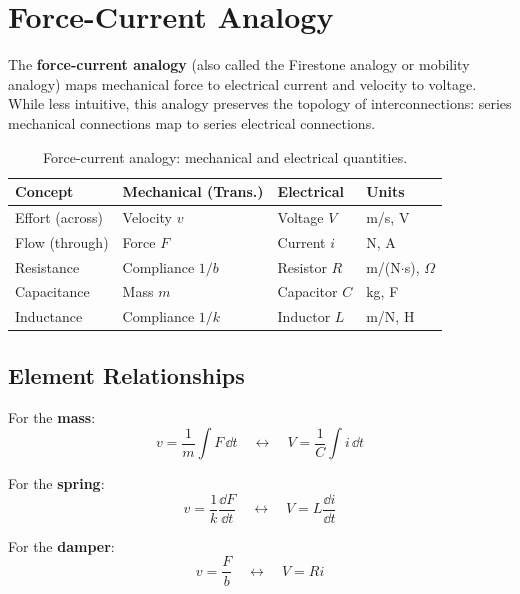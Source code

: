 \section{Force-Current Analogy}
\label{sec:force_current}

The \textbf{force-current analogy} (also called the Firestone analogy or mobility analogy) maps mechanical force to electrical current and velocity to voltage. While less intuitive, this analogy preserves the topology of interconnections: series mechanical connections map to series electrical connections.

\begin{table}[htbp]
\centering
\begin{tabular}{llll}
\toprule
\textbf{Concept} & \textbf{Mechanical (Trans.)} & \textbf{Electrical} & \textbf{Units} \\
\midrule
Effort (across) & Velocity $v$ & Voltage $V$ & m/s, V \\
Flow (through) & Force $F$ & Current $i$ & N, A \\
\midrule
Resistance & Compliance $1/b$ & Resistor $R$ & m/(N$\cdot$s), $\Omega$ \\
Capacitance & Mass $m$ & Capacitor $C$ & kg, F \\
Inductance & Compliance $1/k$ & Inductor $L$ & m/N, H \\
\bottomrule
\end{tabular}
\caption{Force-current analogy: mechanical and electrical quantities.}
\label{tab:force_current}
\end{table}

\subsection{Element Relationships}

For the \textbf{mass}:
\begin{equation}
v = \frac{1}{m}\int F \, \dd t \quad \longleftrightarrow \quad V = \frac{1}{C}\int i \, \dd t
\end{equation}

For the \textbf{spring}:
\begin{equation}
v = \frac{1}{k}\frac{\dd F}{\dd t} \quad \longleftrightarrow \quad V = L\frac{\dd i}{\dd t}
\end{equation}

For the \textbf{damper}:
\begin{equation}
v = \frac{F}{b} \quad \longleftrightarrow \quad V = Ri
\end{equation}


